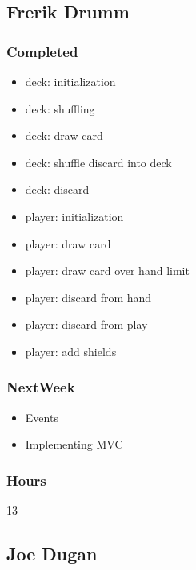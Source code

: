 \documentclass[10pt,a4paper]{article}
\begin{document}
\subsection*{Frerik Drumm}

\subsubsection*{Completed}
\begin{itemize}
\item deck: initialization

\item deck: shuffling

\item deck: draw card

\item deck: shuffle discard into deck

\item deck: discard

\item player: initialization

\item player: draw card

\item player: draw card over hand limit

\item player: discard from hand

\item player: discard from play

\item player: add shields

\end{itemize}
\subsubsection*{NextWeek}
\begin{itemize}
\item Events

\item Implementing MVC

\end{itemize}
\subsubsection*{Hours}
13

\subsection*{Joe Dugan}
\end{document}
